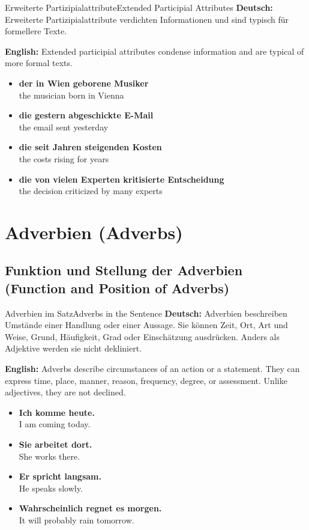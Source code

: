 \documentclass[a4paper,11pt]{article}
\newcommand{\GermanText}[1]{\textbf{Deutsch: }#1\par}
\newcommand{\EnglishText}[1]{{\color{SoftGray}\textbf{English: }#1\par}}
\newcommand{\ExampleItem}[2]{\item \textbf{#1}\\{\color{SoftGray}#2}}
\begin{document}
\begin{grammarentry}{Erweiterte Partizipialattribute}{Extended Participial Attributes}
    \GermanText{Erweiterte Partizipialattribute verdichten Informationen und sind typisch für formellere Texte.}
    \EnglishText{Extended participial attributes condense information and are typical of more formal texts.}
    \begin{exbox}
        \begin{itemize}
            \ExampleItem{der in Wien geborene Musiker}{the musician born in Vienna}
            \ExampleItem{die gestern abgeschickte E-Mail}{the email sent yesterday}
            \ExampleItem{die seit Jahren steigenden Kosten}{the costs rising for years}
            \ExampleItem{die von vielen Experten kritisierte Entscheidung}{the decision criticized by many experts}
        \end{itemize}
    \end{exbox}
\end{grammarentry}


\section{Adverbien {\small (Adverbs)}}

\subsection{Funktion und Stellung der Adverbien {\small (Function and Position of Adverbs)}}

\begin{grammarentry}{Adverbien im Satz}{Adverbs in the Sentence}
    \GermanText{Adverbien beschreiben Umstände einer Handlung oder einer Aussage. Sie können Zeit, Ort, Art und Weise, Grund, Häufigkeit, Grad oder Einschätzung ausdrücken. Anders als Adjektive werden sie nicht dekliniert.}
    \EnglishText{Adverbs describe circumstances of an action or a statement. They can express time, place, manner, reason, frequency, degree, or assessment. Unlike adjectives, they are not declined.}
    \begin{exbox}
        \begin{itemize}
            \ExampleItem{Ich komme heute.}{I am coming today.}
            \ExampleItem{Sie arbeitet dort.}{She works there.}
            \ExampleItem{Er spricht langsam.}{He speaks slowly.}
            \ExampleItem{Wahrscheinlich regnet es morgen.}{It will probably rain tomorrow.}
        \end{itemize}
    \end{exbox}
\end{grammarentry}
\end{document}
